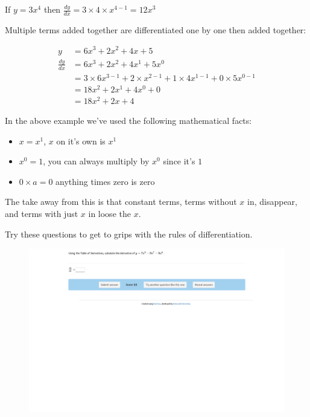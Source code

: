 \documentclass[
  a4paper,
]{scrbook}
\providecommand{\tightlist}{%
  \setlength{\itemsep}{0pt}\setlength{\parskip}{0pt}}\usepackage{longtable,booktabs,array}
\begin{document}
If \(y = 3x^4\) then
\(\frac{dy}{dx} = 3 \times 4 \times x^{4-1} = 12x^3\)

Multiple terms added together are differentiated one by one then added
together:

\[
\begin{aligned} y &= 6x^3 + 2x^2 + 4x + 5 \\
\frac{dy}{dx} &= 6x^3 + 2x^2 + 4x^1 + 5x^0 \\
&= 3\times6x^{3-1} + 2\times x^{2-1} + 1\times 4x^{1-1} + 0\times5x^{0-1} \\
&= 18x^2 + 2x^1 + 4x^{0} + 0 \\
&= 18x^2 + 2x + 4
\end{aligned}
\]

In the above example we've used the following mathematical facts:

\begin{itemize}
\tightlist
\item
  \(x=x^1\), \(x\) on it's own is \(x^1\)
\item
  \(x^0=1\), you can always multiply by \(x^0\) since it's \(1\)
\item
  \(0 \times a = 0\) anything times zero is zero
\end{itemize}

The take away from this is that constant terms, terms without \(x\) in,
disappear, and terms with just \(x\) in loose the \(x\).

Try these questions to get to grips with the rules of differentiation.

\begin{figure}

{\centering 

\href{https://numbas.mathcentre.ac.uk/question/62756/differentiation-using-a-table-of-derivatives-2/embed/?token=f1dc60aa-32b9-4906-98f2-4ddde19c9b79}{\includegraphics{./09-differentiation_files/figure-pdf/unnamed-chunk-2-1.png}}

}

\end{figure}
\end{document}
